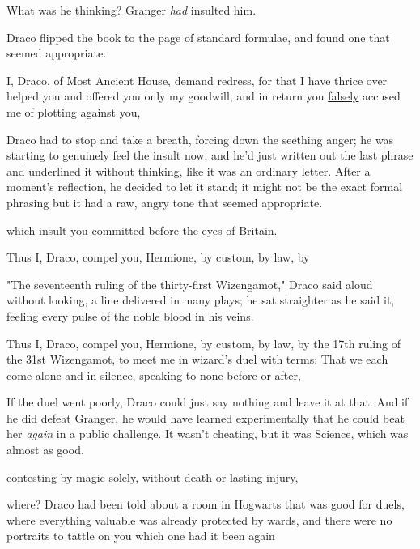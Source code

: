 What was he thinking? Granger \emph{had} insulted him.

Draco flipped the book to the page of standard formulae, and found one that
seemed appropriate.

\begin{writtenNote}
I, Draco, of Most Ancient House, demand redress, for that I have thrice
over helped you and offered you only my goodwill, and in return you
\underline{falsely} accused me of plotting against you,
\end{writtenNote}

Draco had to stop and take a breath, forcing down the seething anger; he was
starting to genuinely feel the insult now, and he'd just written out the last
phrase and underlined it without thinking, like it was an ordinary letter.
After a moment's reflection, he decided to let it stand; it might not be the
exact formal phrasing but it had a raw, angry tone that seemed appropriate.

\begin{writtenNote}
which insult you committed before the eyes of Britain.

Thus I, Draco, compel you, Hermione, by custom, by law, by
\end{writtenNote}

"The seventeenth ruling of the thirty-first Wizengamot," Draco said aloud
without looking, a line delivered in many plays; he sat straighter as he said
it, feeling every pulse of the noble blood in his veins.

\begin{writtenNote}
Thus I, Draco, compel you, Hermione, by custom, by law, by the 17th
ruling of the 31st Wizengamot, to meet me in wizard's duel with terms: That we
each come alone and in silence, speaking to none before or after,
\end{writtenNote}

If the duel went poorly, Draco could just say nothing and leave it at that. And
if he did defeat Granger, he would have learned experimentally that he could
beat her \emph{again} in a public challenge. It wasn't cheating, but it was
Science, which was almost as good.

\begin{writtenNote}
contesting by magic solely, without death or lasting injury,
\end{writtenNote}

{\el} where? Draco had been told about a room in Hogwarts that was good for
duels, where everything valuable was already protected by wards, and there were
no portraits to tattle on you{\el} which one had it been again{\el}

